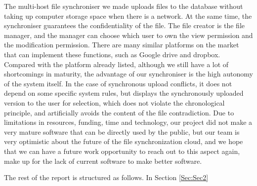 \vspace{0.2cm}
\noindent The multi-host file synchroniser we made uploads files to the database without taking up computer storage space when there is a network. At the same time, the synchroniser guarantees the confidentiality of the file. The file creator is the file manager, and the manager can choose which user to own the view permission and the modification permission. There are many similar platforms on the market that can implement these functions, such as Google drive and dropbox. Compared with the platform already listed, although we still have a lot of shortcomings in maturity, the advantage of our synchroniser is the high autonomy of the system itself. In the case of synchronous upload conflicts, it does not depend on some specific system rules, but displays the synchronously uploaded version to the user for selection, which does not violate the chronological principle, and artificially avoids the content of the file contradiction. Due to limitations in resources, funding, time and technology, our project did not make a very mature software that can be directly used by the public, but our team is very optimistic about the future of the file synchronization cloud, and we hope that we can have a future work opportunity to reach out to this aspect again, make up for the lack of current software to make better software.

\noindent The rest of the report is structured as follows. In Section \ref{Sec:Sec2}


